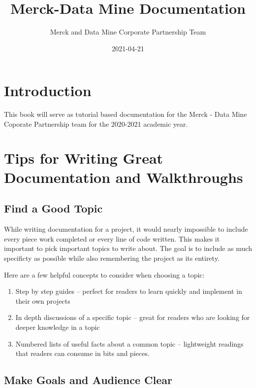 \documentclass[]{book}
\title{Merck-Data Mine Documentation}
\author{Merck and Data Mine Corporate Partnership Team}
\date{2021-04-21}
\begin{document}
\maketitle

{
\setcounter{tocdepth}{1}
\tableofcontents
}
\chapter{Introduction}\label{introduction}

This book will serve as tutorial based documentation for the Merck -
Data Mine Coporate Partnership team for the 2020-2021 academic year.

\chapter{Tips for Writing Great Documentation and
Walkthroughs}\label{tips-for-writing-great-documentation-and-walkthroughs}

\section{Find a Good Topic}\label{find-a-good-topic}

While writing documentation for a project, it would nearly impossible to
include every piece work completed or every line of code written. This
makes it important to pick important topics to write about. The goal is
to include as much specificty as possible while also remembering the
project as its entirety.

Here are a few helpful concepts to consider when choosing a topic:

\begin{enumerate}
\def\labelenumi{\arabic{enumi}.}
\item
  Step by step guides -- perfect for readers to learn quickly and
  implement in their own projects
\item
  In depth discussions of a specific topic -- great for readers who are
  looking for deeper knowledge in a topic
\item
  Numbered lists of useful facts about a common topic -- lightweight
  readings that readers can consume in bits and pieces.
\end{enumerate}

\section{Make Goals and Audience
Clear}\label{make-goals-and-audience-clear}
\end{document}
